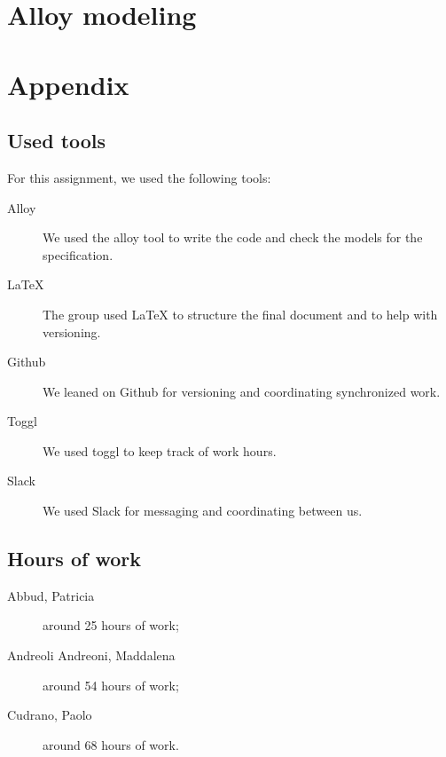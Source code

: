 \documentclass[12pt, a4paper]{article}
\begin{document}
	\newpage
	\section{Alloy modeling}
	

	\newpage
	\section{Appendix}
		\listoffigures
		\listoftables
		
		\subsection{Used tools}
		For this assignment, we used the following tools:
		
		\begin{description}
			\item [Alloy] We used the alloy tool to write the code and check the models for the specification.
			\item [LaTeX] The group used LaTeX to structure the final document and to help with versioning.
			\item [Github] We leaned on Github for versioning and coordinating synchronized work.
			\item [Toggl] We used toggl to keep track of work hours.
			\item [Slack] We used Slack for messaging and coordinating between us.
			
		\end{description}
		
		\subsection{Hours of work}
			\begin{description}
				\item[Abbud, Patricia] around 25 hours of work;
				\item[Andreoli Andreoni, Maddalena] around 54 hours of work;
				\item[Cudrano, Paolo] around 68 hours of work.
			\end{description}
			
		
\end{document}
